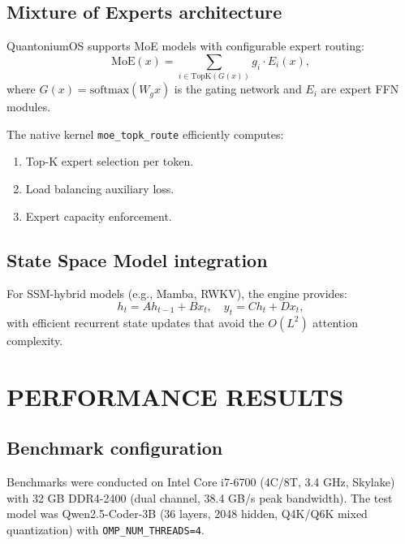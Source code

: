 \documentclass[aip,twocolumn,letterpaper]{revtex4}
\begin{document}
\subsection{Mixture of Experts architecture}

QuantoniumOS supports MoE models with configurable expert routing:
\begin{equation}
\mathrm{MoE}(x) = \sum_{i \in \mathrm{TopK}(G(x))} g_i \cdot E_i(x),
\label{eq:moe}
\end{equation}
where \(G(x) = \mathrm{softmax}(W_g x)\) is the gating network and \(E_i\) are expert FFN modules.

The native kernel \texttt{moe\_topk\_route} efficiently computes:
\begin{enumerate}
\item Top-K expert selection per token.
\item Load balancing auxiliary loss.
\item Expert capacity enforcement.
\end{enumerate}

\subsection{State Space Model integration}

For SSM-hybrid models (e.g., Mamba, RWKV), the engine provides:
\begin{equation}
h_t = A h_{t-1} + B x_t, \quad y_t = C h_t + D x_t,
\label{eq:ssm}
\end{equation}
with efficient recurrent state updates that avoid the \(O(L^2)\) attention complexity.

\section{PERFORMANCE RESULTS}

\subsection{Benchmark configuration}

Benchmarks were conducted on Intel Core i7-6700 (4C/8T, 3.4 GHz, Skylake) with 32 GB DDR4-2400 (dual channel, 38.4 GB/s peak bandwidth). The test model was Qwen2.5-Coder-3B (36 layers, 2048 hidden, Q4K/Q6K mixed quantization) with \texttt{OMP\_NUM\_THREADS=4}.
\end{document}
